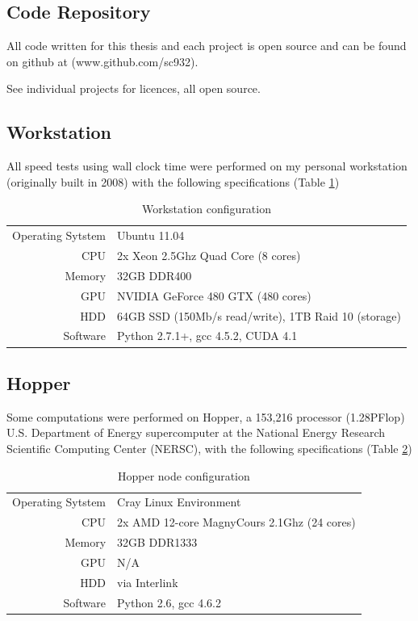 \documentclass[phd,tocprelim]{cornell}
\begin{document}
\subsection{Code Repository}

All code written for this thesis and each project is open source and can be found on github at (www.github.com/sc932).

See individual projects for licences, all open source.

\subsection{Workstation}

All speed tests using wall clock time were performed on my personal workstation (originally built in 2008) with the following specifications (Table \ref{worktab})

\begin{table}[htp]
    \caption{Workstation configuration}
    \label{worktab}
    \begin{center}
\begin{tabular}{r|l}
    Operating Sytstem & Ubuntu 11.04 \\
    CPU & 2x Xeon 2.5Ghz Quad Core (8 cores) \\
    Memory & 32GB DDR400 \\
    GPU & NVIDIA GeForce 480 GTX (480 cores) \\
    HDD & 64GB SSD (150Mb/s read/write), 1TB Raid 10 (storage) \\
    Software & Python 2.7.1+, gcc 4.5.2, CUDA 4.1
\end{tabular}
\end{center}
\end{table}

\subsection{Hopper}

Some computations were performed on Hopper, a 153,216 processor (1.28PFlop) U.S. Department of Energy supercomputer at the National Energy Research Scientific Computing Center (NERSC), with the following specifications (Table \ref{hoppertab})

\begin{table}[htp]
    \caption{Hopper node configuration}
    \label{hoppertab}
    \begin{center}
\begin{tabular}{r|l}
    Operating Sytstem & Cray Linux Environment \\
    CPU & 2x AMD 12-core MagnyCours 2.1Ghz (24 cores) \\
    Memory & 32GB DDR1333 \\
    GPU & N/A \\
    HDD & via Interlink \\
    Software & Python 2.6, gcc 4.6.2
\end{tabular}
\end{center}
\end{table}
\end{document}
